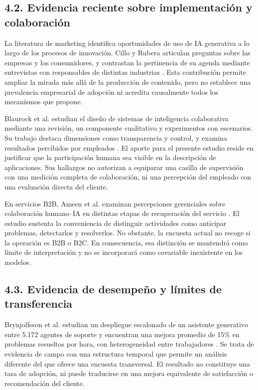 \documentclass[12pt,letterpaper]{article}
\begin{document}
\subsection*{4.2. Evidencia reciente sobre implementación y colaboración}
La literatura de marketing identifica oportunidades de uso de IA generativa a lo largo de los procesos de innovación. Cillo y Rubera articulan preguntas sobre las empresas y los consumidores, y contrastan la pertinencia de su agenda mediante entrevistas con responsables de distintas industrias \citep{cillo}. Esta contribución permite ampliar la mirada más allá de la producción de contenido, pero no establece una prevalencia empresarial de adopción ni acredita causalmente todos los mecanismos que propone.

Blaurock et al. estudian el diseño de sistemas de inteligencia colaborativa mediante una revisión, un componente cualitativo y experimentos con escenarios. Su trabajo destaca dimensiones como transparencia y control, y examina resultados percibidos por empleados \citep{blaurock}. El aporte para el presente estudio reside en justificar que la participación humana sea visible en la descripción de aplicaciones. Sus hallazgos no autorizan a equiparar una casilla de supervisión con una medición completa de colaboración, ni una percepción del empleado con una evaluación directa del cliente.

En servicios B2B, Ameen et al. examinan percepciones gerenciales sobre colaboración humano--IA en distintas etapas de recuperación del servicio \citep{ameen}. El estudio sustenta la conveniencia de distinguir actividades como anticipar problemas, detectarlos y resolverlos. No obstante, la encuesta actual no recoge si la operación es B2B o B2C. En consecuencia, esa distinción se mantendrá como límite de interpretación y no se incorporará como covariable inexistente en los modelos.

\subsection*{4.3. Evidencia de desempeño y límites de transferencia}
Brynjolfsson et al. estudian un despliegue escalonado de un asistente generativo entre 5.172 agentes de soporte y encuentran una mejora promedio de 15\% en problemas resueltos por hora, con heterogeneidad entre trabajadores \citep{bryn}. Se trata de evidencia de campo con una estructura temporal que permite un análisis diferente del que ofrece una encuesta transversal. El resultado no constituye una tasa de adopción, ni puede traducirse en una mejora equivalente de satisfacción o recomendación del cliente.
\end{document}
